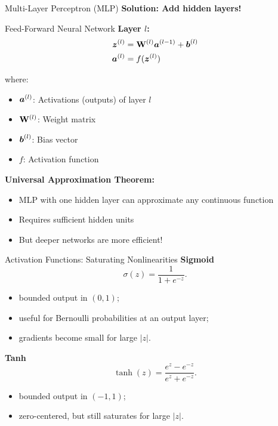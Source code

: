 \documentclass[aspectratio=169]{beamer}
\begin{document}
\begin{frame}{Multi-Layer Perceptron (MLP)}
  \textbf{Solution: Add hidden layers!}

  \begin{definitionbox}{Feed-Forward Neural Network}
    \textbf{Layer $l$:}
    \begin{align}
      \boldsymbol{z}^{(l)} &= \mathbf{W}^{(l)} \boldsymbol{a}^{(l-1)} + \boldsymbol{b}^{(l)} \\
      \boldsymbol{a}^{(l)} &= f(\boldsymbol{z}^{(l)})
    \end{align}

    where:
    \begin{itemize}
      \item $\boldsymbol{a}^{(l)}$: Activations (outputs) of layer $l$
      \item $\mathbf{W}^{(l)}$: Weight matrix
      \item $\boldsymbol{b}^{(l)}$: Bias vector
      \item $f$: Activation function
    \end{itemize}
  \end{definitionbox}

  \vspace{0.5em}

  \textbf{Universal Approximation Theorem:}
  \begin{itemize}
    \item MLP with one hidden layer can approximate any continuous function
    \item Requires sufficient hidden units
    \item But deeper networks are more efficient!
  \end{itemize}
\end{frame}

\begin{frame}{Activation Functions: Saturating Nonlinearities}
\textbf{Sigmoid}
\[
  \sigma(z)=\frac{1}{1+e^{-z}}.
\]
\begin{itemize}
  \item bounded output in $(0,1)$;
  \item useful for Bernoulli probabilities at an output layer;
  \item gradients become small for large $|z|$.
\end{itemize}

\textbf{Tanh}
\[
  \tanh(z)=\frac{e^z-e^{-z}}{e^z+e^{-z}}.
\]
\begin{itemize}
  \item bounded output in $(-1,1)$;
  \item zero-centered, but still saturates for large $|z|$.
\end{itemize}
\end{frame}
\end{document}
